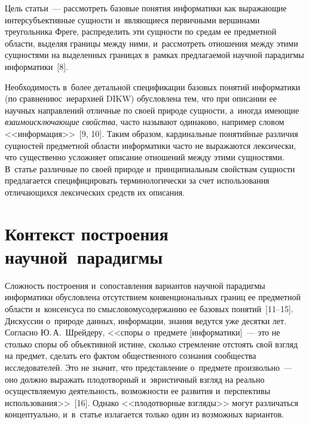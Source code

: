 \begin{multicols}{2}
  Цель статьи~--- рассмотреть базовые понятия информатики как выражающие 
интерсубъективные сущности и~являющиеся первичными вершинами 
треугольника Фреге, распределить эти сущности по средам ее предметной 
области, выделяя границы между ними, и~рассмотреть отношения между этими 
сущностями на выделенных границах в~рамках предлагаемой научной 
парадигмы информатики~[8].
  
  Необходимость в~более детальной спецификации базовых понятий 
информатики (по сравнению\linebreak с~иерархией DIKW) обусловлена тем, что при 
описании ее научных на\-прав\-ле\-ний отличные по своей природе сущ\-ности, 
а~иногда име\-ющие \textit{взаимоисключающие свойства}, часто называют 
\mbox{одинаково}, например словом <<информация>>~[9, 10]. Таким образом, 
кардинальные понятийные различия сущностей предметной об\-ласти 
информатики час\-то не выражаются лексически, что существенно усложняет 
описание отношений между этими сущностями. В~статье различные по своей 
природе и~принципиальным свойствам сущ\-ности предлагается 
специфицировать терминологически за счет использования отличающихся 
лексических средств их описания.

  
\section{Контекст построения научной~парадигмы}


  Сложность построения и~сопоставления вариантов научной парадигмы 
информатики обуслов\-лена отсутствием конвенциональных границ ее 
предметной области и~консенсуса по смысловому\linebreak содержанию ее базовых 
понятий~[11--15]. Дискуссии о~природе данных, информации, знания ведутся 
уже десятки лет. Согласно Ю.\,А.~Шрейдеру, <<споры о~предмете 
[информатики]~--- это не столько споры об объективной истине, сколько 
стремление отстоять свой взгляд на предмет, сделать его фактом 
общественного сознания сообщества исследователей. Это не значит, что 
представление о~предмете произвольно~--- оно долж\-но выражать плодотворный 
и~эвристичный взгляд на реально осу\-щест\-в\-ля\-емую дея\-тель\-ность, воз\-мож\-но\-сти 
ее развития и~перспективы использования>>~[16]. Однако <<плодотворные 
взгляды>> могут различаться концептуально, и~в~\mbox{статье} излагается только один 
из возможных вариантов.
  

\end{multicols}
